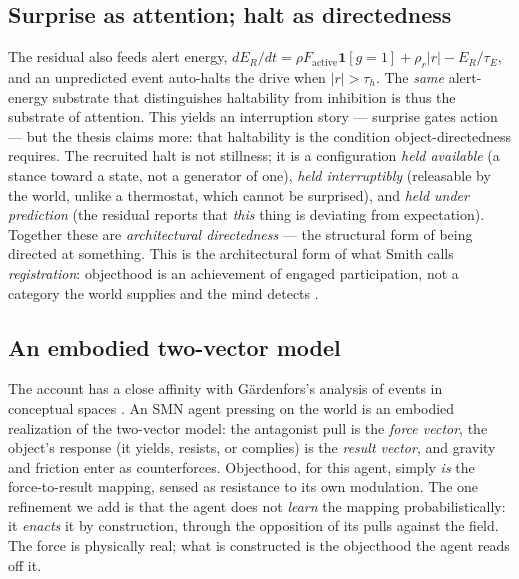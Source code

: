 \documentclass[utf8]{FrontiersinHarvard}
\begin{document}
\subsection{Surprise as attention; halt as directedness}
The residual also feeds alert energy, $dE_R/dt = \rho F_{\text{active}}\mathbf 1[g{=}1] + \rho_r|r| - E_R/\tau_E$, and an unpredicted event auto-halts the drive when $|r|>\tau_h$. The \emph{same} alert-energy substrate that distinguishes haltability from inhibition is thus the substrate of attention. This yields an interruption story --- surprise gates action --- but the thesis claims more: that haltability is the condition object-directedness requires. The recruited halt is not stillness; it is a configuration \emph{held available} (a stance toward a state, not a generator of one), \emph{held interruptibly} (releasable by the world, unlike a thermostat, which cannot be surprised), and \emph{held under prediction} (the residual reports that \emph{this} thing is deviating from expectation). Together these are \emph{architectural directedness} --- the structural form of being directed at something. This is the architectural form of what Smith calls \emph{registration}: objecthood is an achievement of engaged participation, not a category the world supplies and the mind detects \citep{Smith1996OriginObjects}.

\subsection{An embodied two-vector model}
The account has a close affinity with G\"ardenfors's analysis of events in conceptual spaces \citep{Gardenfors2020Events,Gardenfors2019Robot}. An SMN agent pressing on the world is an embodied realization of the two-vector model: the antagonist pull is the \emph{force vector}, the object's response (it yields, resists, or complies) is the \emph{result vector}, and gravity and friction enter as counterforces. Objecthood, for this agent, simply \emph{is} the force-to-result mapping, sensed as resistance to its own modulation. The one refinement we add is that the agent does not \emph{learn} the mapping probabilistically: it \emph{enacts} it by construction, through the opposition of its pulls against the field. The force is physically real; what is constructed is the objecthood the agent reads off it.
\end{document}
